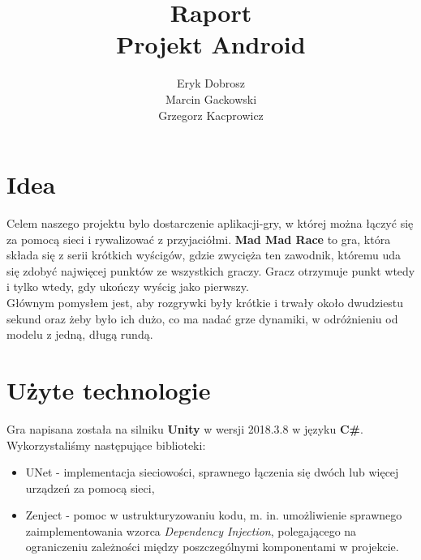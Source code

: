 \documentclass[]{report}
\begin{document}
\title{Raport\\
	\large Projekt Android}
\author{Eryk Dobrosz \\
	Marcin Gackowski \\
	Grzegorz Kacprowicz}

{\let\newpage\relax\maketitle}


\chapter*{Idea}
\quad Celem naszego projektu bylo dostarczenie aplikacji-gry, w której można łączyć się za pomocą sieci i rywalizować z przyjaciółmi. \textbf{Mad Mad Race} to gra, która składa się z serii krótkich wyścigów, gdzie zwycięża ten zawodnik, któremu uda się zdobyć najwięcej punktów ze wszystkich graczy. Gracz otrzymuje punkt wtedy i tylko wtedy, gdy ukończy wyścig jako pierwszy. \\
Głównym pomysłem jest, aby rozgrywki były krótkie i trwały około dwudziestu sekund oraz żeby było ich dużo, co ma nadać grze dynamiki, w odróżnieniu od modelu z jedną, długą rundą.

\chapter*{Użyte technologie}
\quad Gra napisana została na silniku \textbf{Unity} w wersji 2018.3.8 w języku \textbf{C\#}. Wykorzystaliśmy następujące biblioteki:
\begin{itemize}
	\item UNet - implementacja sieciowości, sprawnego łączenia się dwóch lub więcej urządzeń za pomocą sieci,
	\item Zenject - pomoc w ustrukturyzowaniu kodu, m. in. umożliwienie sprawnego zaimplementowania wzorca \textit{Dependency Injection}, polegającego na ograniczeniu zależności między poszczególnymi komponentami w projekcie.
\end{itemize}
\end{document}

